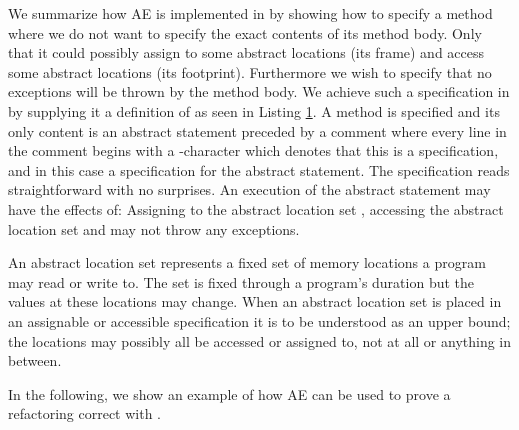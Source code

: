 We summarize how AE is implemented in \Refinity{} by showing how to specify a method  where we do not want to specify the exact contents of its method body.
Only that it could possibly assign to some abstract locations (its frame) and access some abstract locations (its footprint).
Furthermore we wish to specify that no exceptions will be thrown by the method body.
We achieve such a specification in \Refinity{} by supplying it a definition of  as seen in Listing \ref{lst:ExtractVariable-refinity-method}.
A method is specified and its only content is an abstract statement  preceded by a comment where every line in the
comment begins with a -character which denotes that this is a specification, and in this case a specification for the abstract statement.
The specification reads straightforward with no surprises. An execution of the abstract statement  may have the effects of: Assigning to the
abstract location set , accessing the abstract location set  and may not throw any exceptions.

An abstract location set represents a fixed set of memory locations a program may read or write to.
The set is fixed through a program's duration but the values at these locations may change.
When an abstract location set is placed in an assignable or accessible specification it is to be understood as an upper bound;
the locations may possibly all be accessed or assigned to, not at all or anything in between.

\begin{figure}[h]
  \centering
  \begin{minipage}{.65\linewidth}
  
  \label{lst:ExtractVariable-refinity-method}
  \end{minipage}
\end{figure}


In the following, we show an example of how AE can be used to prove a refactoring correct with \Refinity{}. 


